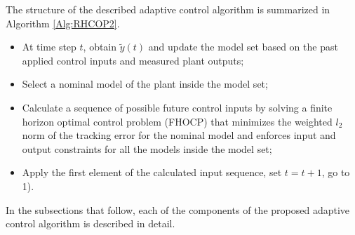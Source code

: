 \documentclass[10 pt, letterpaper]{article}
\begin{document}
The structure of the described adaptive control algorithm is summarized in Algorithm \ref{Alg:RHCOP2}.
\begin{algorithm}
\begin{itemize}
  \item[1)]At time step $t$, obtain $\tilde{y}(t)$ and update the model set based on the past applied control inputs and measured plant outputs;
\item[2)] Select a nominal model of the plant inside the model set;
  \item[3)]Calculate a sequence of possible future control inputs by solving a finite horizon optimal control problem (FHOCP) that minimizes the weighted $l_2$ norm of the tracking error for the nominal model and enforces input and output constraints for all the models inside the model set;
  \item[4)]Apply the first element of the calculated input sequence, set $t=t+1$, go to 1).
\end{itemize}
\caption{Adaptive MPC algorithm}\label{Alg:RHCOP2}
\end{algorithm}
In the subsections that follow, each of the components of the proposed adaptive control algorithm is described in detail.
\end{document}

